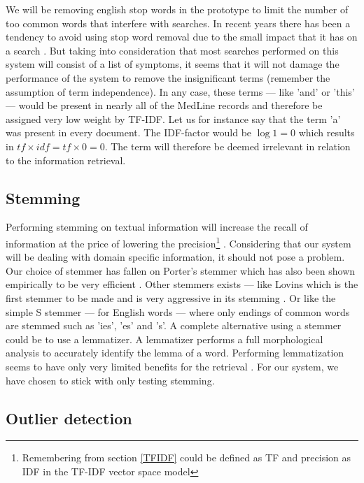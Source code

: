 We will be removing english stop words in the prototype to limit the
number of too common words that interfere with searches. In recent
years there has been a tendency to avoid using stop word removal due
to the small impact that it has on a search \cite{IntroIR2009}. But
taking into consideration that most searches performed on this system
will consist of a list of symptoms, it seems that it will not damage
the performance of the system to remove the insignificant terms
(remember the assumption of term independence). In any case, these
terms --- like 'and' or 'this' --- would be present in nearly all of
the MedLine records and therefore be assigned very low weight by
TF-IDF. Let us for instance say that the term 'a' was present in every
document. The IDF-factor would be $\log 1 = 0$ which results in
$\mathit{tf} \times \mathit{idf} = \mathit{tf} \times 0 = 0$. The term
will therefore be deemed irrelevant in relation to the information
retrieval.

\subsection{Stemming}

Performing stemming on textual information will increase the recall of
information at the price of lowering the
precision\footnote{Remembering from section \ref{TFIDF} could be
  defined as TF and precision as IDF in the TF-IDF vector space model}
\cite{IntroIR2009}. Considering that our system will be dealing with
domain specific information, it should not pose a problem. Our choice
of stemmer has fallen on Porter's stemmer which has also been shown
empirically to be very efficient \cite{IntroIR2009}. Other stemmers
exists --- like Lovins which is the first stemmer to be made and is
very aggressive in its stemming \cite{Kurz2002309}. Or like the simple
S stemmer --- for English words --- where only endings of common words
are stemmed such as 'ies', 'es' and 's'. A complete alternative using
a stemmer could be to use a lemmatizer. A lemmatizer performs a full
morphological analysis to accurately identify the lemma of a word. Performing
lemmatization seems to have only very limited benefits for the
retrieval \cite{IntroIR2009}. For our system, we have chosen to stick with only
testing stemming.

\subsection{Outlier detection}


